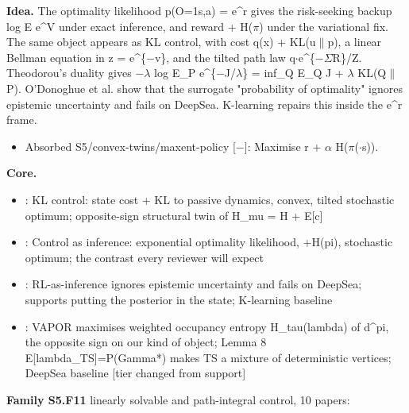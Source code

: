 \documentclass[10pt]{article}
\newcommand{\memb}[1]{\par\smallskip\textbf{#1}\quad}
\begin{document}
\textbf{Idea.} The optimality likelihood p(O=1\textbar{}s,a) = e\^{}r gives the risk-seeking backup log E e\^{}V under exact inference, and reward + H(\ensuremath{\pi}) under the variational fix. The same object appears as KL control, with cost q(x) + KL(u\ensuremath{\|}p), a linear Bellman equation in z = e\^{}\{\ensuremath{-}v\}, and the tilted path law q\ensuremath{\cdot}e\^{}\{\ensuremath{-}\ensuremath{\Sigma}R\}/Z. Theodorou's duality gives \ensuremath{-}\ensuremath{\lambda} log E\_P e\^{}\{\ensuremath{-}J/\ensuremath{\lambda}\} = inf\_Q E\_Q J + \ensuremath{\lambda} KL(Q\ensuremath{\|}P). O'Donoghue et al. show that the surrogate "probability of optimality" ignores epistemic uncertainty and fails on DeepSea. K-learning repairs this inside the e\^{}r frame.
\begin{itemize}[nosep,leftmargin=1.2em]
\item Absorbed S5/convex-twins/maxent-policy [\ensuremath{-}]: Maximise r + \ensuremath{\alpha} H(\ensuremath{\pi}(\ensuremath{\cdot}\textbar{}s)).
\end{itemize}


\memb{Core.}
\begin{itemize}[nosep,leftmargin=1.2em]
\item \citet{Todorov-efficient09}: KL control: state cost + KL to passive dynamics, convex, tilted stochastic optimum; opposite-sign structural twin of H\_mu = H + E[c]
\item \citet{Levine-reinforcement18}: Control as inference: exponential optimality likelihood, +H(pi), stochastic optimum; the contrast every reviewer will expect
\item \citet{ODonoghue-making20}: RL-as-inference ignores epistemic uncertainty and fails on DeepSea; supports putting the posterior in the state; K-learning baseline
\item \citet{Tarbouriech-probabilistic23}: VAPOR maximises weighted occupancy entropy H\_tau(lambda) of d\^{}pi, the opposite sign on our kind of object; Lemma 8 E[lambda\_TS]=P(Gamma*) makes TS a mixture of deterministic vertices; DeepSea baseline [tier changed from support]
\end{itemize}
\memb{Family S5.F11} linearly solvable and path-integral control, 10 papers: {\footnotesize \citetext{\citealp{Todorov-efficient09}; \citealp{Kappen-path05}; \citealp{Todorov-linearlysolvable07}; \citealp{Theodorou-relative12}; \citealp{Kappen-linear05}; \citealp{Todorov-general08}\dag; \citealp{Theodorou-reinforcement10}\dag; \citealp{Dvijotham-unifying11}; \citealp{Azar-dynamic12}; \citealp{Guan-online14}}}
\end{document}
